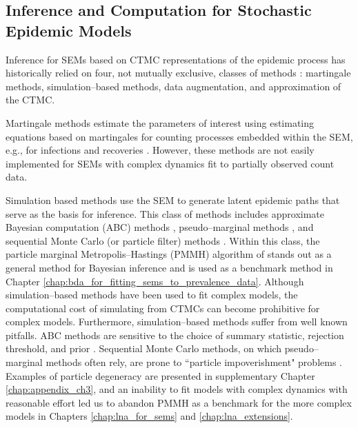 \subsection{Inference and Computation for Stochastic Epidemic Models}
\label{subsec:sem_exact_inf}
Inference for SEMs based on CTMC representations of the epidemic process has historically relied on four, not mutually exclusive, classes of methods \cite{oneill2010}: martingale methods, simulation--based methods, data augmentation, and approximation of the CTMC. 

Martingale methods estimate the parameters of interest using estimating equations based on martingales for counting processes embedded within the SEM, e.g., for infections and recoveries \citep{andersson2000stochastic,becker1977general,lau2008estimating, lindenstrand2013estimation,sudbury1985proportion}. However, these methods are not easily implemented for SEMs with complex dynamics fit to partially observed count data.

Simulation based methods use the SEM to generate latent epidemic paths that serve as the basis for inference. This class of methods includes approximate Bayesian computation (ABC) methods \citep{mckinley2009,toni2009,mckinley2018approximate}, pseudo--marginal methods \citep{mckinley2014simulation,shubin2016revealing}, and sequential Monte Carlo (or particle filter) methods \cite{andrieu2010particle, dukic2012,golightly2018efficient,ionides2011iterated,koepke2016predictive,toni2009}. Within this class, the particle marginal Metropolis--Hastings (PMMH) algorithm of \cite{andrieu2010particle} stands out as a general method for Bayesian inference and is used as a benchmark method in Chapter \ref{chap:bda_for_fitting_sems_to_prevalence_data}. Although simulation--based methods have been used to fit complex models, the computational cost of simulating from CTMCs can become prohibitive for complex models. Furthermore, simulation--based methods suffer from well known pitfalls. ABC methods are sensitive to the choice of summary statistic, rejection threshold, and prior  \cite{toni2009}. Sequential Monte Carlo methods, on which pseudo--marginal methods often rely, are prone to ``particle impoverishment" problems \cite{cappe2006inference, dukic2012}. Examples of particle degeneracy are presented in supplementary Chapter \ref{chap:appendix_ch3}, and an inability to fit models  with complex dynamics with reasonable effort led us to abandon PMMH as a benchmark for the more complex models in Chapters \ref{chap:lna_for_sems} and \ref{chap:lna_extensions}. 

